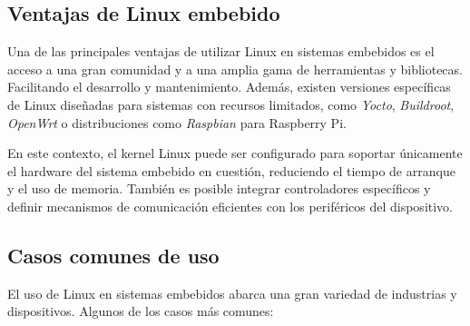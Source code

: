 \documentclass[12pt, letterpaper]{article}
\begin{document}
	\subsection{Ventajas de Linux embebido}

	Una de las principales ventajas de utilizar Linux en sistemas embebidos es el acceso a una gran comunidad y a una amplia gama de herramientas y bibliotecas. Facilitando el desarrollo y mantenimiento. Además, existen versiones específicas de Linux diseñadas para sistemas con recursos limitados, como \textit{Yocto}, \textit{Buildroot}, \textit{OpenWrt} o distribuciones como \textit{Raspbian} para Raspberry Pi.

	En este contexto, el kernel Linux puede ser configurado para soportar únicamente el hardware del sistema embebido en cuestión, reduciendo el tiempo de arranque y el uso de memoria. También es posible integrar controladores específicos y definir mecanismos de comunicación eficientes con los periféricos del dispositivo.

	\subsection{Casos comunes de uso}

	El uso de Linux en sistemas embebidos abarca una gran variedad de industrias y dispositivos. Algunos de los casos más comunes:
\end{document}
